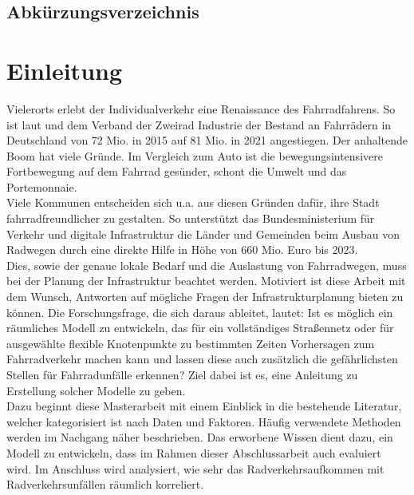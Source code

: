 \documentclass[a4paper,12pt]{thesis}
\begin{document}
\begingroup
\let\clearpage\relax
\listoffigures
\listoftables
\endgroup

\section{Abkürzungsverzeichnis}

\begin{acronym}
\end{acronym}

\chapter{Einleitung}

Vielerorts erlebt der Individualverkehr eine Renaissance des Fahrradfahrens. So ist laut \cite{Eisenberger2015} und dem Verband der Zweirad Industrie \cite{ZIV2022} der Bestand an Fahrrädern in Deutschland von 72 Mio. in 2015 auf 81 Mio. in 2021 angestiegen. Der anhaltende Boom hat viele Gründe. Im Vergleich zum Auto ist die bewegungsintensivere Fortbewegung auf dem Fahrrad gesünder, schont die Umwelt und das Portemonnaie.\\
Viele Kommunen entscheiden sich u.a. aus diesen Gründen dafür, ihre Stadt fahrradfreundlicher zu gestalten. So unterstützt das Bundesministerium für Verkehr und digitale Infrastruktur \cite{VerkehrunddigitaleInfrastruktur2020} die Länder und Gemeinden beim Ausbau von Radwegen durch eine direkte Hilfe in Höhe von 660 Mio. Euro bis 2023.\\
Dies, sowie der genaue lokale Bedarf und die Auslastung von Fahrradwegen, muss bei der Planung der Infrastruktur beachtet werden. Motiviert ist diese Arbeit mit dem Wunsch, Antworten auf mögliche Fragen der Infrastrukturplanung bieten zu können. Die Forschungsfrage, die sich daraus ableitet, lautet: Ist es möglich ein räumliches Modell zu entwickeln, das für ein vollständiges Straßennetz oder für ausgewählte flexible Knotenpunkte zu bestimmten Zeiten Vorhersagen zum Fahrradverkehr machen kann und lassen diese auch zusätzlich die gefährlichsten Stellen für Fahrradunfälle erkennen? Ziel dabei ist es, eine Anleitung zu Erstellung solcher Modelle zu geben.\\
Dazu beginnt diese Masterarbeit mit einem Einblick in die bestehende Literatur, welcher kategorisiert ist nach Daten und Faktoren. Häufig verwendete Methoden werden im Nachgang näher beschrieben. Das erworbene Wissen dient dazu, ein Modell zu entwickeln, dass im Rahmen dieser Abschlussarbeit auch evaluiert wird. Im Anschluss wird analysiert, wie sehr das Radverkehrsaufkommen mit Radverkehrsunfällen räumlich korreliert.
\end{document}
